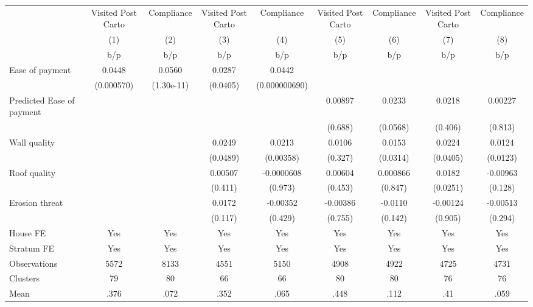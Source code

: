 {
\def\sym#1{\ifmmode^{#1}\else\(^{#1}\)\fi}
\begin{tabular}{l*{8}{c}}
\toprule
                &\multicolumn{1}{c}{Visited Post Carto}&\multicolumn{1}{c}{Compliance}&\multicolumn{1}{c}{Visited Post Carto}&\multicolumn{1}{c}{Compliance}&\multicolumn{1}{c}{Visited Post Carto}&\multicolumn{1}{c}{Compliance}&\multicolumn{1}{c}{Visited Post Carto}&\multicolumn{1}{c}{Compliance}\\
                &\multicolumn{1}{c}{(1)}&\multicolumn{1}{c}{(2)}&\multicolumn{1}{c}{(3)}&\multicolumn{1}{c}{(4)}&\multicolumn{1}{c}{(5)}&\multicolumn{1}{c}{(6)}&\multicolumn{1}{c}{(7)}&\multicolumn{1}{c}{(8)}\\
                &      b/p&      b/p&      b/p&      b/p&      b/p&      b/p&      b/p&      b/p\\
\midrule
Ease of payment &   0.0448&   0.0560&   0.0287&   0.0442&         &         &         &         \\
                &(0.000570)&(1.30e-11)& (0.0405)&(0.000000690)&         &         &         &         \\
Predicted Ease of payment&         &         &         &         &  0.00897&   0.0233&   0.0218&  0.00227\\
                &         &         &         &         &  (0.688)& (0.0568)&  (0.406)&  (0.813)\\
Wall quality    &         &         &   0.0249&   0.0213&   0.0106&   0.0153&   0.0224&   0.0124\\
                &         &         & (0.0489)&(0.00358)&  (0.327)& (0.0314)& (0.0405)& (0.0123)\\
Roof quality    &         &         &  0.00507&-0.0000608&  0.00604& 0.000866&   0.0182& -0.00963\\
                &         &         &  (0.411)&  (0.973)&  (0.453)&  (0.847)& (0.0251)&  (0.128)\\
Erosion threat  &         &         &   0.0172& -0.00352& -0.00386&  -0.0110& -0.00124& -0.00513\\
                &         &         &  (0.117)&  (0.429)&  (0.755)&  (0.142)&  (0.905)&  (0.294)\\
House FE        &      Yes&      Yes&      Yes&      Yes&      Yes&      Yes&      Yes&      Yes\\
Stratum FE      &      Yes&      Yes&      Yes&      Yes&      Yes&      Yes&      Yes&      Yes\\
\midrule
Observations    &     5572&     8133&     4551&     5150&     4908&     4922&     4725&     4731\\
Clusters        &       79&       80&       66&       66&       80&       80&       76&       76\\
Mean            &     .376&     .072&     .352&     .065&     .448&     .112&      .41&     .059\\
\bottomrule
\end{tabular}
}
